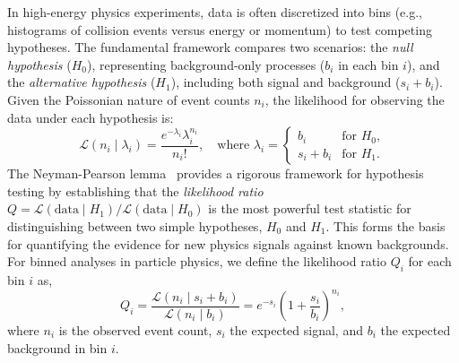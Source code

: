 In high-energy physics experiments, data is often discretized into bins (e.g., histograms of collision events versus energy or momentum) to test competing hypotheses. The fundamental framework compares two scenarios: the \textit{null hypothesis} ($H_0$), representing background-only processes ($b_i$ in each bin $i$), and the \textit{alternative hypothesis} ($H_1$), including both signal and background ($s_i + b_i$). Given the Poissonian nature of event counts $n_i$, the likelihood for observing the data under each hypothesis is:
\begin{equation}
    \mathcal{L}(n_i \mid \lambda_i) = \frac{e^{-\lambda_i} \lambda_i^{n_i}}{n_i!}, \quad \text{where } \lambda_i = 
    \begin{cases}
        b_i & \text{for } H_0, \\
        s_i + b_i & \text{for } H_1.
    \end{cases}
\end{equation}
The Neyman-Pearson lemma~\parencite{NeymanPearson1933} provides a rigorous framework for hypothesis testing by establishing that the \textit{likelihood ratio} $Q = \mathcal{L}(\text{data} \mid H_1)/\mathcal{L}(\text{data} \mid H_0)$ is the most powerful test statistic for distinguishing between two simple hypotheses, $H_0$ and $H_1$. This forms the basis for quantifying the evidence for new physics signals against known backgrounds. For binned analyses in particle physics, we define the likelihood ratio $Q_i$ for each bin $i$ as,
\begin{equation}
Q_i = \frac{\mathcal{L}(n_i \mid s_i + b_i)}{\mathcal{L}(n_i \mid b_i)} = e^{-s_i} \left( 1+\frac{s_i}{b_i} \right)^{n_i},
\end{equation}
where $n_i$ is the observed event count, $s_i$ the expected signal, and $b_i$ the expected background in bin $i$. 


